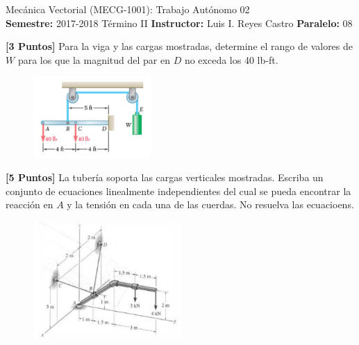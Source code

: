 \documentclass[ a4paper, twoside, 11pt]{article}
\newcommand{\numero}{02}
\begin{document}
\allowdisplaybreaks

\begin{center}
\Large Mec\'anica Vectorial (MECG-1001): Trabajo Aut\'onomo \numero \\[2ex]
\small \textbf{Semestre:} 2017-2018 T\'ermino II \qquad
\textbf{Instructor:} Luis I. Reyes Castro \qquad
\textbf{Paralelo:} 08
\end{center}
\fullskip

\begin{problem}
\textbf{[3 Puntos]} Para la viga y las cargas mostradas, determine el rango de valores de $W$ para los que la magnitud del par en $D$ no exceda los 40 lb-ft. 

\begin{figure}[htb]
\centering
\includegraphics[width=0.4\textwidth]{problema-1.jpg}
\end{figure}

\end{problem}
\vspace{\baselineskip}

\begin{problem}
\textbf{[5 Puntos]} La tuber\'ia soporta las cargas verticales mostradas. Escriba un conjunto de ecuaciones linealmente independientes del cual se pueda encontrar la reacci\'on en $A$ \linebreak y la tensi\'on en cada una de las cuerdas. No resuelva las ecuacioens. 

\begin{figure}[htb]
\centering
\includegraphics[width=0.5\textwidth]{problema-2.jpg}
\end{figure}

\end{problem}
\vspace{\baselineskip}
\end{document}
